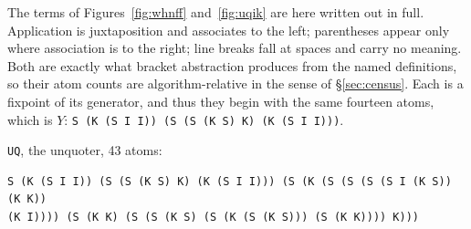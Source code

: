\documentclass[review]{jfp-epi}
\begin{document}

The terms of Figures~\ref{fig:whnff} and~\ref{fig:uqik} are here written
out in full.
Application is juxtaposition and associates to the left; parentheses
appear only where association is to the right; line breaks fall at
spaces and carry no meaning. Both are exactly what bracket abstraction
produces from the named definitions, so their atom counts are
algorithm-relative in the sense of \S\ref{sec:census}. Each is a fixpoint
of its generator, and thus they begin with the same fourteen atoms, which
is $Y$:  \mbox{\texttt{S (K (S I I)) (S (S (K S) K) (K (S I I)))}}.

\texttt{UQ}, the unquoter, 43 atoms:
\begin{verbatim}
S (K (S I I)) (S (S (K S) K) (K (S I I))) (S (K (S (S (S (S I (K S)) (K K))
(K I)))) (S (K K) (S (S (K S) (S (K (S (K S))) (S (K K)))) K)))
\end{verbatim}
\end{document}
